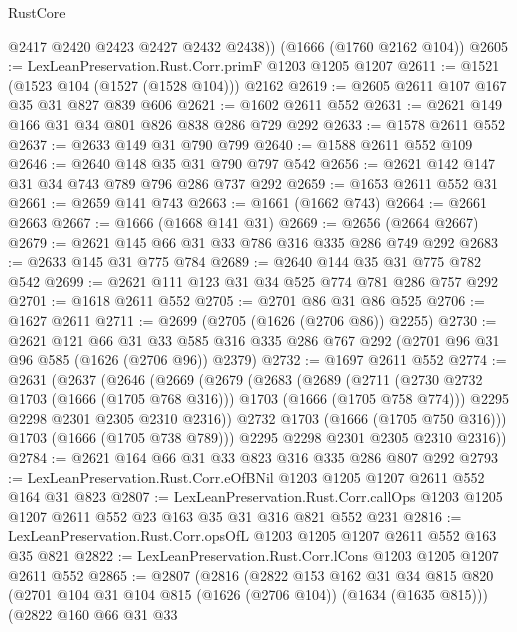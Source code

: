 \begin{lexlean}{RustCore}
\begin{coremodule}
        @2417
        @2420
        @2423
        @2427
        @2432
        @2438))
    (@1666 (@1760 @2162 @104))
@2605 := LexLeanPreservation.Rust.Corr.primF @1203 @1205 @1207
@2611 := @1521 (@1523 @104 (@1527 (@1528 @104))) @2162
@2619 := @2605 @2611 @107 @167 @35 @31 @827 @839 @606
@2621 := @1602 @2611 @552
@2631 := @2621 @149 @166 @31 @34 @801 @826 @838 @286 @729 @292
@2633 := @1578 @2611 @552
@2637 := @2633 @149 @31 @790 @799
@2640 := @1588 @2611 @552 @109
@2646 := @2640 @148 @35 @31 @790 @797 @542
@2656 := @2621 @142 @147 @31 @34 @743 @789 @796 @286 @737 @292
@2659 := @1653 @2611 @552 @31
@2661 := @2659 @141 @743
@2663 := @1661 (@1662 @743)
@2664 := @2661 @2663
@2667 := @1666 (@1668 @141 @31)
@2669 := @2656 (@2664 @2667)
@2679 := @2621 @145 @66 @31 @33 @786 @316 @335 @286 @749 @292
@2683 := @2633 @145 @31 @775 @784
@2689 := @2640 @144 @35 @31 @775 @782 @542
@2699 := @2621 @111 @123 @31 @34 @525 @774 @781 @286 @757 @292
@2701 := @1618 @2611 @552
@2705 := @2701 @86 @31 @86 @525
@2706 := @1627 @2611
@2711 := @2699 (@2705 (@1626 (@2706 @86)) @2255)
@2730 := @2621
    @121
    @66
    @31
    @33
    @585
    @316
    @335
    @286
    @767
    @292
    (@2701 @96 @31 @96 @585 (@1626 (@2706 @96)) @2379)
@2732 := @1697 @2611 @552
@2774 := @2631
    (@2637
      (@2646
        (@2669
          (@2679
            (@2683
              (@2689
                (@2711
                  (@2730 @2732 @1703 (@1666 (@1705 @768 @316)))
                  @1703
                  (@1666 (@1705 @758 @774)))
                @2295
                @2298
                @2301
                @2305
                @2310
                @2316))
            @2732
            @1703
            (@1666 (@1705 @750 @316)))
          @1703
          (@1666 (@1705 @738 @789)))
        @2295
        @2298
        @2301
        @2305
        @2310
        @2316))
@2784 := @2621 @164 @66 @31 @33 @823 @316 @335 @286 @807 @292
@2793 := LexLeanPreservation.Rust.Corr.eOfBNil @1203 @1205 @1207 @2611 @552 @164 @31 @823
@2807 := LexLeanPreservation.Rust.Corr.callOps
    @1203
    @1205
    @1207
    @2611
    @552
    @23
    @163
    @35
    @31
    @316
    @821
    @552
    @231
@2816 := LexLeanPreservation.Rust.Corr.opsOfL @1203 @1205 @1207 @2611 @552 @163 @35 @821
@2822 := LexLeanPreservation.Rust.Corr.lCons @1203 @1205 @1207 @2611 @552
@2865 := @2807
    (@2816
      (@2822
        @153
        @162
        @31
        @34
        @815
        @820
        (@2701 @104 @31 @104 @815 (@1626 (@2706 @104)) (@1634 (@1635 @815)))
        (@2822
          @160
          @66
          @31
          @33

\end{coremodule}
\end{lexlean}
